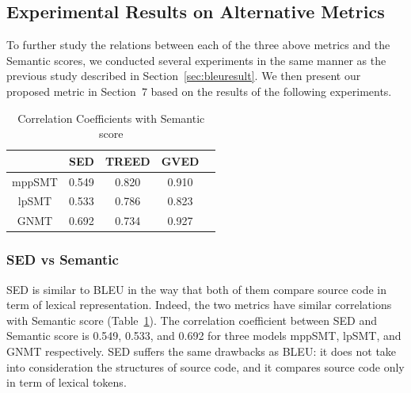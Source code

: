\subsection{Experimental Results on Alternative Metrics}

To further study the relations between each of the three above metrics
and the Semantic scores, we conducted several experiments in the same
manner as the previous study described in
Section~\ref{sec:bleuresult}. We then present our proposed metric
in Section~7 based on the results of the following experiments.


\begin{table}
\caption{Correlation Coefficients with Semantic score}
\begin{tabular}{|c|c|c|c|c|}
\hline
 & SED & TREED & GVED\\
\hline
mppSMT  & 0.549 & 0.820 & 0.910 \\
lpSMT  & 0.533 & 0.786 & 0.823 \\
GNMT & 0.692 & 0.734 & 0.927 \\
\hline
\end{tabular}
\label{table:correlation}
\end{table}


\subsubsection{\textbf{SED vs Semantic}}

SED is similar to BLEU in the way that both of them compare source
code in term of lexical representation. Indeed, the two metrics have
similar correlations with Semantic score
(Table~\ref{table:correlation}). The correlation coefficient between SED and Semantic score is 0.549,
 0.533, and 0.692 for three models mppSMT, lpSMT, and GNMT respectively. 
SED suffers the same drawbacks as BLEU: it does not take into
consideration the structures of source code, and it compares source
code only in term of lexical tokens. 

